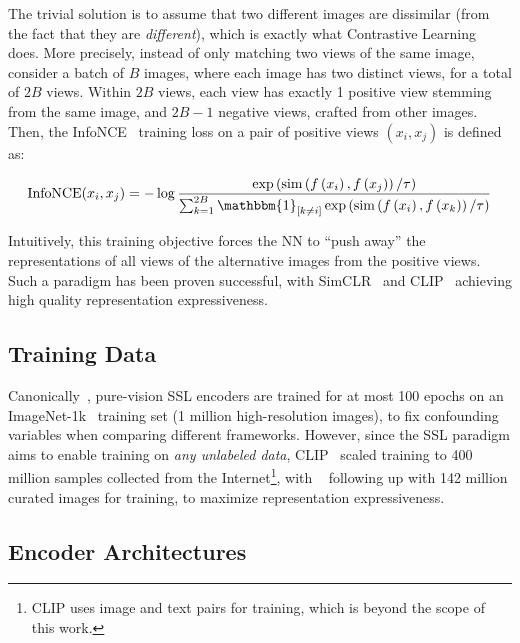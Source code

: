 The trivial solution is to assume that two different images are dissimilar (from the fact that they are \textit{different}), which is exactly what Contrastive Learning~\cite{contrastivelearningog} does. More precisely, instead of only matching two views of the same image, consider a batch of $B$ images, where each image has two distinct views, for a total of $2B$ views. Within $2B$ views, each view has exactly 1 positive view stemming from the same image, and $2B-1$ negative views, crafted from other images. Then, the InfoNCE~\cite{infonceloss} training loss on a pair of positive views $(x_i,x_j)$ is defined as:

\begin{equation}
    \label{eq:infonce}
    \text{InfoNCE}(x_i,x_j)=-\log\frac{
        \exp\left(\text{sim}\left(f\left(x_i\right),f\left(x_j\right)\right)/\tau\right)
        }{
        \sum_{k=1}^{2B}\mathbbm{1}_{[k\neq i]}\exp\left(
            \text{sim}\left(f\left(x_i\right),f\left(x_k\right)\right)/\tau
        \right)
    }
\end{equation}

Intuitively, this training objective forces the NN to ``push away'' the representations of all views of the alternative images from the positive views. Such a paradigm has been proven successful, with SimCLR~\cite{simclr} and CLIP~\cite{clip} achieving high quality representation expressiveness.

\subsection{Training Data}

Canonically~\cite{simclr,simsiam,dinov1}, pure-vision SSL encoders are trained for at most 100 epochs on an ImageNet-1k~\cite{imagenet} training set (1 million high-resolution images), to fix confounding variables when comparing different frameworks. However, since the SSL paradigm aims to enable training on \textit{any unlabeled data}, CLIP~\cite{clip} scaled training to 400 million samples collected from the Internet\footnote{CLIP uses image and text pairs for training, which is beyond the scope of this work.}, with \DINOvtwo~\cite{dinov2} following up with 142 million curated images for training, to maximize representation expressiveness.

\subsection{Encoder Architectures}

